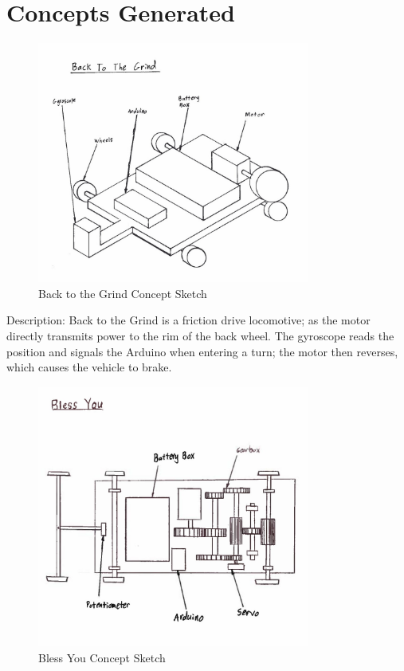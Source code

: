 \documentclass[class=../report, crop=false]{standalone}
\begin{document}
\section{Concepts Generated} \label{app:concepts}

\begin{figure}[H]
	\centering
	\includegraphics[width=0.8\textwidth]{../../res/img/bttg}
	\caption{Back to the Grind Concept Sketch}
	\label{app/fig:bttg}
\end{figure}

Description: Back to the Grind is a friction drive locomotive; as the motor directly transmits power to the rim of the back wheel.
The gyroscope reads the position and signals the Arduino when entering a turn; the motor then reverses, which causes the vehicle to brake.

\clearpage

\begin{figure}[H]
	\centering
	\includegraphics[width=0.8\textwidth]{../../res/img/blessyou}
	\caption{Bless You Concept Sketch}
	\label{app/fig:blessyou}
\end{figure}
\end{document}
